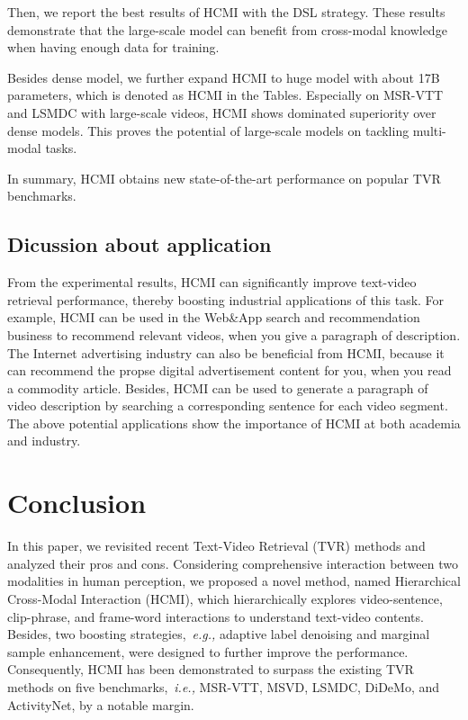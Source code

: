 \documentclass{article}
\begin{document}
Then, we report the best results of HCMI with the DSL strategy. 
These results demonstrate that the large-scale model can benefit from cross-modal knowledge when having enough data for training.

Besides dense model, we further expand HCMI to huge model with about 17B parameters,
which is denoted as HCMI in the Tables. Especially on MSR-VTT and LSMDC with
large-scale videos, HCMI shows dominated superiority over dense models. This proves the
potential of large-scale models on tackling multi-modal tasks.

In summary, HCMI obtains new state-of-the-art performance on popular TVR benchmarks.

\subsection{Dicussion about application}
From the experimental results, HCMI can significantly improve text-video retrieval performance, thereby boosting industrial applications of this task.
For example, HCMI can be used in the Web\&App search and recommendation business to recommend relevant videos, when you give a paragraph of description.
The Internet advertising industry can also be beneficial from HCMI, because it can recommend the propse digital advertisement content for you, when you read a commodity article.
Besides, HCMI can be used to generate a paragraph of video description by searching a corresponding sentence for each video segment. The above potential applications show the importance of HCMI at both academia and industry.

\section{Conclusion}
In this paper, we revisited recent Text-Video Retrieval (TVR) methods and analyzed their pros and cons.
Considering comprehensive interaction between two modalities in human perception, we proposed a novel method, named Hierarchical Cross-Modal Interaction (HCMI), which hierarchically explores video-sentence, clip-phrase, and frame-word interactions to understand text-video contents.
Besides, two boosting strategies,~\emph{e.g.,} adaptive label denoising and marginal sample enhancement, were designed to further improve the performance.
Consequently, HCMI has been demonstrated to surpass the existing TVR methods on five benchmarks,~\emph{i.e.,} MSR-VTT, MSVD, LSMDC, DiDeMo, and ActivityNet, by a notable margin.



\end{document}
